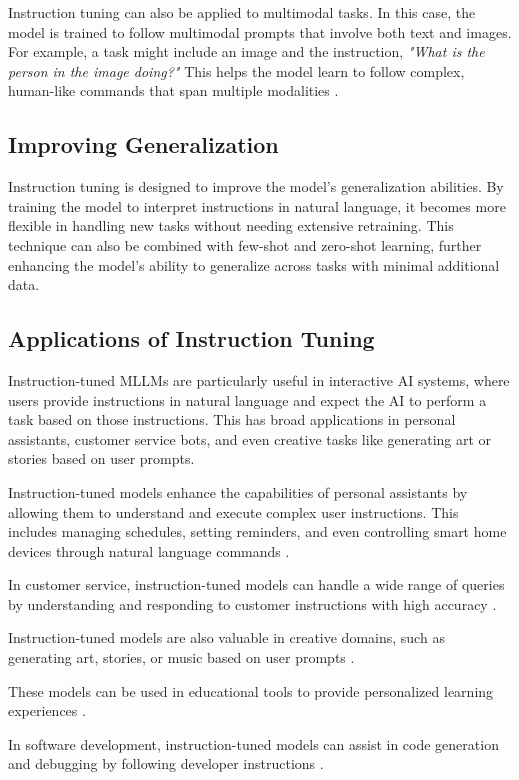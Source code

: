 Instruction tuning can also be applied to multimodal tasks. In this case, the model is trained to follow multimodal prompts that involve both text and images. For example, a task might include an image and the instruction, \textit{"What is the person in the image doing?"} This helps the model learn to follow complex, human-like commands that span multiple modalities \cite{MultimodalInstructionTuning2024}.


\subsection{Improving Generalization}

Instruction tuning is designed to improve the model’s generalization abilities. By training the model to interpret instructions in natural language, it becomes more flexible in handling new tasks without needing extensive retraining. This technique can also be combined with few-shot and zero-shot learning, further enhancing the model’s ability to generalize across tasks with minimal additional data.

\subsection{Applications of Instruction Tuning}

Instruction-tuned MLLMs are particularly useful in interactive AI systems, where users provide instructions in natural language and expect the AI to perform a task based on those instructions. This has broad applications in personal assistants, customer service bots, and even creative tasks like generating art or stories based on user prompts.

Instruction-tuned models enhance the capabilities of personal assistants by allowing them to understand and execute complex user instructions. This includes managing schedules, setting reminders, and even controlling smart home devices through natural language commands \cite{LarkSuite}.

In customer service, instruction-tuned models can handle a wide range of queries by understanding and responding to customer instructions with high accuracy \cite{OpenAICommunity}.

Instruction-tuned models are also valuable in creative domains, such as generating art, stories, or music based on user prompts \cite{RohitAggarwal}.

These models can be used in educational tools to provide personalized learning experiences \cite{RedditExperience}.

In software development, instruction-tuned models can assist in code generation and debugging by following developer instructions \cite{RohitAggarwal}.

